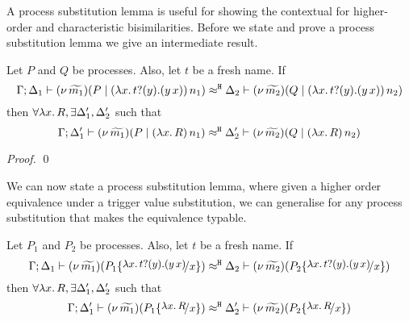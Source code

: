 
A process substitution lemma is useful for showing the
contextual for higher-order and characteristic bisimilarities.
Before we state and prove a process substitution lemma
we give an intermediate result.


\begin{lemma}
	\label{lem:tigger_subst}
	Let $P$ and $Q$ be processes. Also, let $t$ be a fresh name. If
	\[
		\Gamma; \Delta_1 \vdash (\nu\, \widetilde{m_1})(P \;|\; (\lambda x.\,t ? (y) . (y\, {x}))\, {n_1} ) \approx^\mathtt{H} \Delta_2 \vdash (\nu\, \widetilde{m_2})(Q \;|\; (\lambda x.\,t ? (y) . (y\, {x}))\, {n_2} )
	\]
	then $\forall \lambda x.\,R, \exists \Delta_1', \Delta_2'$ such that
	\[
		\Gamma; \Delta_1' \vdash (\nu\, \widetilde{m_1})(P \;|\; (\lambda x.\,R)\, {n_1} ) \approx^\mathtt{H} \Delta_2' \vdash (\nu\, \widetilde{m_2})(Q \;|\; (\lambda x.\,R)\, {n_2} )
	\]
\end{lemma}

\begin{proof}
	\qed
\end{proof}



We can now state a process substitution lemma, where given
a higher order equivalence under a trigger value substitution,
we can generalise for any process substitution that makes
the equivalence typable.

\begin{lemma}
	Let $P_1$ and $P_2$ be processes. Also, let $t$ be a fresh name. 
	If
	\[
		\horel{\Gamma}{\Delta_1}{\newsp{\widetilde{m_1}}{P_1 \subst{\trvalx{t}}{x} }}
		{\hwb}
		{\Delta_2}{\newsp{\widetilde{m_2}}{P_2 \subst{\trvalx{t}}{x} }}
	\]
	then $\forall \lambda x.\,R, \exists \Delta_1', \Delta_2'$ such that
	\[
		\horel{\Gamma}{\Delta_1'}{\newsp{\widetilde{m_1}}{P_1 \subst{{\abs{x}{R}}}{x} }}
		{\hwb}
		{\Delta_2'}{\newsp{\widetilde{m_2}}{P_2 \subst{{\abs{x}{R}}}{x} }}
	\]
\end{lemma}


